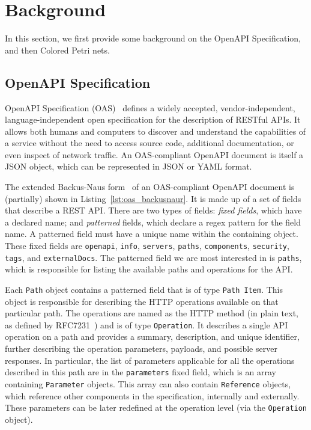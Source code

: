 \section{Background}
\label{sec:background}

\newcommand{\code}[1]{\texttt{#1}}

In this section, we first provide some background on the OpenAPI Specification, and  then Colored Petri nets.

\subsection{OpenAPI Specification}

OpenAPI Specification (OAS)~\cite{OpenAPISpecification} defines a widely accepted,  vendor-independent, language-independent open specification for the description of RESTful APIs.  It allows both humans and computers to discover and understand the capabilities of a service without the need to access source code, additional documentation, or even inspect of network traffic. An OAS-compliant OpenAPI document is itself a JSON object, which can be represented in JSON or YAML format.

\sloppy
The extended Backus-Naus form~\cite{ISO-14977} of an OAS-compliant OpenAPI document is (partially) shown in Listing~\ref{lst:oas_backusnaur}. It is made up of a set of fields that describe a REST API. There are two types of fields: {\em fixed fields}, which have a declared name; and {\em patterned} fields, which declare a regex pattern for the field name. A patterned field must have a unique name within the containing object. These fixed fields are {\tt openapi}, {\tt info}, {\tt servers}, {\tt paths}, {\tt components}, {\tt security}, {\tt tags}, and {\tt externalDocs}. %
%
The patterned field we are most interested in is {\tt paths}, which is responsible for listing the available paths and operations for the API.

Each \code{Path} object contains a patterned field that is of type \code{Path Item}. This object is responsible for describing the HTTP operations available on that particular path. The operations are named as the HTTP method (in plain text, as defined by RFC7231~\cite{fielding2014hypertext}) and is of type \code{Operation}. It describes a single API operation on a path and provides a summary, description, and unique identifier, further describing the operation parameters, payloads, and possible server responses. In particular, the list of parameters applicable for all the operations described in this path are in the {\tt parameters} fixed field, which is an array containing \code{Parameter} objects. This array can also contain \code{Reference} objects, which reference other components in the specification, internally and externally. These parameters can be later redefined at the operation level (via the \code{Operation} object).

